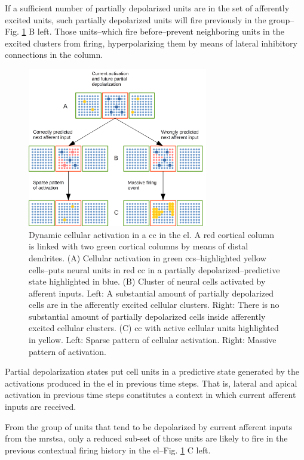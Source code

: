 \documentclass[11pt,a4paper]{article}
\begin{document}
If a sufficient number of partially depolarized units are in the set of
afferently excited units, such partially depolarized units
will fire previously in the group--Fig. \ref{fig:Activation} B left.
Those units--which fire before--prevent neighboring units in the excited clusters from firing,
hyperpolarizing them by means of lateral inhibitory connections in the column.

\begin{figure}[h!]
    \centering
    \includegraphics[width=0.7\textwidth]{Activation.png}
    \caption{Dynamic cellular activation in a \gls{cc} in the \gls{el}.
    A red cortical column is linked with two green cortical columns by means of distal dendrites.
    (A) Cellular activation in green \glspl{cc}--highlighted yellow cells--puts neural units
    in red \gls{cc} in a partially depolarized--predictive state highlighted in blue.
    (B) Cluster of neural cells activated by afferent inputs.
    Left: A substantial amount of partially depolarized cells are in the afferently excited cellular clusters.
    Right: There is no substantial amount of partially depolarized cells inside afferently excited cellular clusters.
    (C) \gls{cc} with active cellular units highlighted in yellow.
    Left: Sparse pattern of cellular activation.
    Right: Massive pattern of activation.}
    \label{fig:Activation}
\end{figure}

Partial depolarization states put cell units in a predictive state generated by
the activations produced in the \gls{el} in previous time steps.
That is, lateral and apical activation in previous time steps constitutes a context in which
current afferent inputs are received.

From the group of units that tend to be depolarized by current afferent inputs from the \gls{mrstsa},
only a reduced sub-set of those units are likely to fire in the previous contextual firing history
in the \gls{el}--Fig. \ref{fig:Activation} C left.
\end{document}
